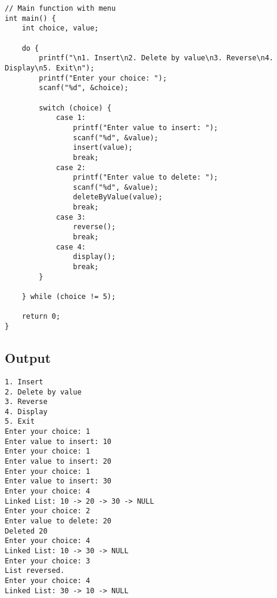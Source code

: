 \documentclass[12pt,a4paper]{article}
\begin{document}
\begin{lstlisting}
// Main function with menu
int main() {
    int choice, value;

    do {
        printf("\n1. Insert\n2. Delete by value\n3. Reverse\n4. Display\n5. Exit\n");
        printf("Enter your choice: ");
        scanf("%d", &choice);

        switch (choice) {
            case 1:
                printf("Enter value to insert: ");
                scanf("%d", &value);
                insert(value);
                break;
            case 2:
                printf("Enter value to delete: ");
                scanf("%d", &value);
                deleteByValue(value);
                break;
            case 3:
                reverse();
                break;
            case 4:
                display();
                break;
        }

    } while (choice != 5);

    return 0;
}
\end{lstlisting}

\subsection*{Output}
\begin{tcolorbox}[terminalstyle, title=Sample Output]
\texttt{1. Insert\\2. Delete by value\\3. Reverse\\4. Display\\5. Exit\\
Enter your choice: 1\\
Enter value to insert: 10\\
Enter your choice: 1\\
Enter value to insert: 20\\
Enter your choice: 1\\
Enter value to insert: 30\\
Enter your choice: 4\\
Linked List: 10 -> 20 -> 30 -> NULL\\
Enter your choice: 2\\
Enter value to delete: 20\\
Deleted 20\\
Enter your choice: 4\\
Linked List: 10 -> 30 -> NULL\\
Enter your choice: 3\\
List reversed.\\
Enter your choice: 4\\
Linked List: 30 -> 10 -> NULL}
\end{tcolorbox}
\end{document}
